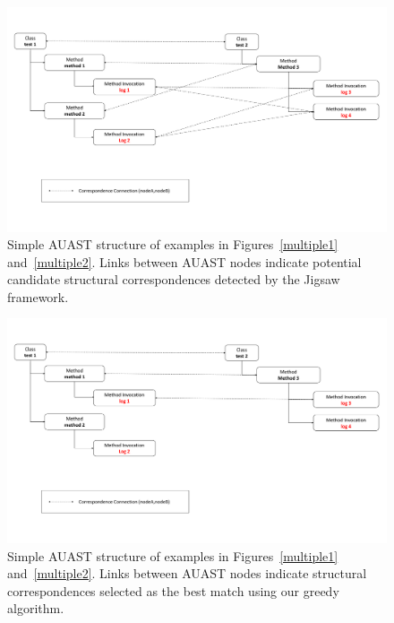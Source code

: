 \begin{figure} [H]
  \centering\includegraphics [width = \textwidth]{Drawing4/multipleLogging.pdf}
  \caption{Simple AUAST structure of examples in Figures~\ref{multiple1} and~\ref{multiple2}. Links between AUAST nodes indicate potential candidate structural correspondences detected by the Jigsaw framework.}
  \label{mast_1}
\end{figure}


\begin{figure} [H]
  \centering\includegraphics [width = \textwidth]{Drawing4/multipleLogging2.pdf}
  \caption{Simple AUAST structure of examples in Figures~\ref{multiple1} and~\ref{multiple2}. Links between AUAST nodes indicate structural correspondences selected as the best match using our greedy algorithm.}
  \label{m_ast2}
\end{figure}

